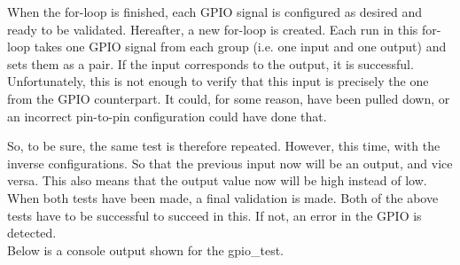 \noindent When the for-loop is finished, each GPIO signal is configured as desired and ready to be validated. Hereafter, a new for-loop is created. Each run in this for-loop takes one GPIO signal from each group (i.e. one input and one output) and sets them as a pair. If the input corresponds to the output, it is successful.\\

\noindent Unfortunately, this is not enough to verify that this input is precisely the one from the GPIO counterpart. It could, for some reason, have been pulled down, or an incorrect pin-to-pin configuration could have done that.

So, to be sure, the same test is therefore repeated. However, this time, with the inverse configurations. So that the previous input now will be an output, and vice versa. This also means that the output value now will be high instead of low.\\

\noindent When both tests have been made, a final validation is made. Both of the above tests have to be successful to succeed in this. If not, an error in the GPIO is detected.\\
\noindent Below is a console output shown for the gpio\_test.

